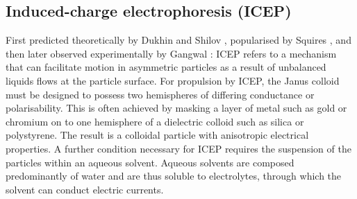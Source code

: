 \subsection{Induced-charge electrophoresis (ICEP)}
First predicted theoretically by Dukhin and Shilov \etal \cite{dukhin1980,shilov2000}, popularised by Squires \etal \cite{squires2006}, and then later observed experimentally by Gangwal \etal \cite{gangwal2008}: ICEP refers to a mechanism that can facilitate motion in asymmetric particles as a result of unbalanced liquids flows at the particle surface. 
For propulsion by ICEP, the Janus colloid must be designed to possess two hemispheres of differing conductance or polarisability. This is often achieved by masking a layer of metal such as gold or chromium on to one hemisphere of a dielectric colloid such as silica or polystyrene. The result is a colloidal particle with anisotropic electrical properties. A further condition necessary for ICEP requires the suspension of the particles within an aqueous solvent. Aqueous solvents are composed predominantly of water and are thus soluble to electrolytes, through which the solvent can conduct electric currents. 


